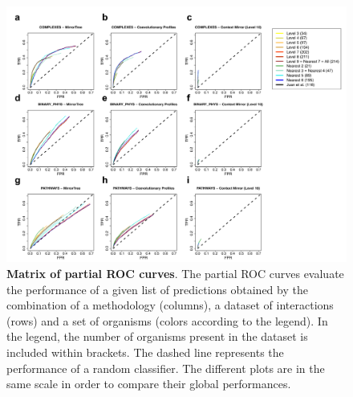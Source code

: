 \begin{figure}[htbp]
\centering
\includegraphics[keepaspectratio,width=\textwidth,height=0.75\textheight]{../figures/selectionROCs_noscales.pdf}
\caption{\textbf{Matrix of partial ROC curves}. The partial ROC curves evaluate the performance of a given list of predictions obtained by the combination of a methodology (columns), a dataset of interactions (rows) and a set of organisms (colors according to the legend). In the legend, the number of organisms present in the dataset is included within brackets. The dashed line represents the performance of a random classifier. The different plots are in the same scale in order to compare their global performances.}
\label{selectionrocs_noscales.pdf}
\end{figure}

